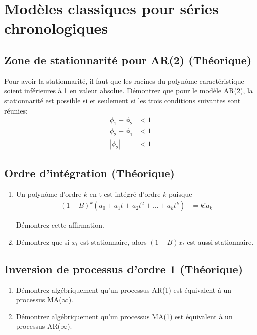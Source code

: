 \documentclass[11pt,english,francais]{article}
\begin{document}


\addtocounter{section}{1}

\section{Modèles classiques pour séries chronologiques}

\subsection{Zone de stationnarité pour AR(2) (Théorique)}
\label{sec:zone-de-stat}


Pour avoir la stationnarité, il faut que les racines du polynôme caractéristique soient inférieures à 1 en valeur absolue. Démontrez que pour le modèle AR(2), la stationnarité est possible si et seulement si les trois conditions suivantes sont réunies:
\begin{align*}
  \phi_1 + \phi_2 &< 1 \\
  \phi_2 - \phi_1 &< 1 \\
  |\phi_2| &< 1
\end{align*}

\subsection{Ordre d'intégration (Théorique)}
\label{sec:ordre-dintegration}

\begin{enumerate}
\item 
Un polynôme d'ordre $k$ en t est intégré d'ordre $k$ puisque
\begin{align*}
  (1-B)^k(a_0+a_1t+a_2t^2+\ldots+a_kt^k) &= k!a_k 
\end{align*}

Démontrez cette affirmation.
\item 

Démontrez que si $x_t$ est stationnaire, alors $(1-B)x_t$ est aussi stationnaire.
\end{enumerate}

\subsection{Inversion de processus d'ordre 1 (Théorique)}
\label{sec:invers-de-proc}

\begin{enumerate}
\item 
Démontrez algébriquement qu'un processus AR(1) est équivalent à un processus MA($\infty$).

\item 
Démontrez algébriquement qu'un processus MA(1) est équivalent à un processus AR($\infty$).
\end{enumerate}
\end{document}
